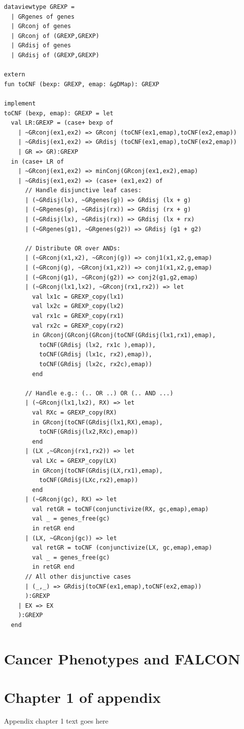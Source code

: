 \documentclass[phd,tocprelim]{cornell}
\theoremstyle{break}
\theoremstyle{empty}
\begin{document}
\begin{verbatim}
dataviewtype GREXP = 
  | GRgenes of genes
  | GRconj of genes
  | GRconj of (GREXP,GREXP)
  | GRdisj of genes
  | GRdisj of (GREXP,GREXP)

extern
fun toCNF (bexp: GREXP, emap: &gDMap): GREXP

implement
toCNF (bexp, emap): GREXP = let     
  val LR:GREXP = (case+ bexp of 
    | ~GRconj(ex1,ex2) => GRconj (toCNF(ex1,emap),toCNF(ex2,emap))
    | ~GRdisj(ex1,ex2) => GRdisj (toCNF(ex1,emap),toCNF(ex2,emap))   
    | GR => GR):GREXP
  in (case+ LR of  
    | ~GRconj(ex1,ex2) => minConj(GRconj(ex1,ex2),emap) 
    | ~GRdisj(ex1,ex2) => (case+ (ex1,ex2) of
      // Handle disjunctive leaf cases:         
      | (~GRdisj(lx), ~GRgenes(g)) => GRdisj (lx + g) 
      | (~GRgenes(g), ~GRdisj(rx)) => GRdisj (rx + g)
      | (~GRdisj(lx), ~GRdisj(rx)) => GRdisj (lx + rx)
      | (~GRgenes(g1), ~GRgenes(g2)) => GRdisj (g1 + g2)

      // Distribute OR over ANDs:
      | (~GRconj(x1,x2), ~GRconj(g)) => conj1(x1,x2,g,emap) 
      | (~GRconj(g), ~GRconj(x1,x2)) => conj1(x1,x2,g,emap) 
      | (~GRconj(g1), ~GRconj(g2)) => conj2(g1,g2,emap)
      | (~GRconj(lx1,lx2), ~GRconj(rx1,rx2)) => let
        val lx1c = GREXP_copy(lx1)
        val lx2c = GREXP_copy(lx2) 
        val rx1c = GREXP_copy(rx1)
        val rx2c = GREXP_copy(rx2) 
        in GRconj(GRconj(GRconj(toCNF(GRdisj(lx1,rx1),emap), 
          toCNF(GRdisj (lx2, rx1c ),emap)),
          toCNF(GRdisj (lx1c, rx2),emap)), 
          toCNF(GRdisj (lx2c, rx2c),emap)) 
        end

      // Handle e.g.: (.. OR ..) OR (.. AND ...) 
      | (~GRconj(lx1,lx2), RX) => let
        val RXc = GREXP_copy(RX)
        in GRconj(toCNF(GRdisj(lx1,RX),emap),
          toCNF(GRdisj(lx2,RXc),emap)) 
        end
      | (LX ,~GRconj(rx1,rx2)) => let
        val LXc = GREXP_copy(LX)
        in GRconj(toCNF(GRdisj(LX,rx1),emap),
          toCNF(GRdisj(LXc,rx2),emap)) 
        end
      | (~GRconj(gc), RX) => let
        val retGR = toCNF(conjunctivize(RX, gc,emap),emap)
        val _ = genes_free(gc)
        in retGR end
      | (LX, ~GRconj(gc)) => let
        val retGR = toCNF (conjunctivize(LX, gc,emap),emap)
        val _ = genes_free(gc)
        in retGR end
      // All other disjunctive cases
      | (_,_) => GRdisj(toCNF(ex1,emap),toCNF(ex2,emap))
      ):GREXP
    | EX => EX
    ):GREXP
  end
\end{verbatim}


\chapter{Cancer Phenotypes and FALCON}

\appendix
\chapter{Chapter 1 of appendix}
Appendix chapter 1 text goes here


\end{document}
